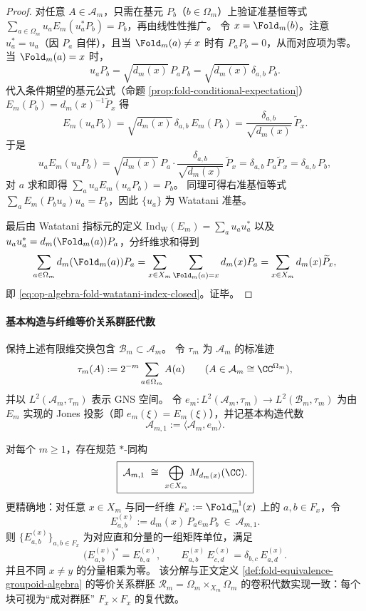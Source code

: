 \begin{proof}
对任意 \(A\in\mathcal{A}_m\)，只需在基元 \(P_b\)（\(b\in\Omega_m\)）上验证准基恒等式
\(
\sum_{a\in\Omega_m}u_a E_m(u_a^\ast P_b)=P_b
\)，再由线性性推广。
令 \(x=\Fold_m(b)\)。注意 \(u_a^\ast=u_a\)（因 \(P_a\) 自伴），且当 \(\Fold_m(a)\neq x\) 时有 \(P_aP_b=0\)，从而对应项为零。
当 \(\Fold_m(a)=x\) 时，
\[
u_aP_b=\sqrt{d_m(x)}\,P_aP_b=\sqrt{d_m(x)}\,\delta_{a,b}\,P_b.
\]
代入条件期望的基元公式（命题 \ref{prop:fold-conditional-expectation}）
\(
E_m(P_b)=d_m(x)^{-1}\widetilde P_x
\)
得
\[
E_m(u_aP_b)
=\sqrt{d_m(x)}\,\delta_{a,b}\,E_m(P_b)
=\frac{\delta_{a,b}}{\sqrt{d_m(x)}}\,\widetilde P_x.
\]
于是
\[
u_aE_m(u_aP_b)
=\sqrt{d_m(x)}\,P_a\cdot \frac{\delta_{a,b}}{\sqrt{d_m(x)}}\,\widetilde P_x
=\delta_{a,b}\,P_a\widetilde P_x
=\delta_{a,b}\,P_b,
\]
对 \(a\) 求和即得 \(\sum_a u_aE_m(u_aP_b)=P_b\)。
同理可得右准基恒等式 \(\sum_a E_m(P_bu_a)u_a=P_b\)，因此 \(\{u_a\}\) 为 Watatani 准基。

最后由 Watatani 指标元的定义
\(
\mathrm{Ind}_{\mathrm{W}}(E_m)=\sum_a u_a u_a^\ast
\)
以及 \(u_a u_a^\ast=d_m(\Fold_m(a))P_a\)，分纤维求和得到
\[
\sum_{a\in\Omega_m} d_m(\Fold_m(a))P_a
=\sum_{x\in X_m}\sum_{\Fold_m(a)=x} d_m(x)P_a
=\sum_{x\in X_m} d_m(x)\widetilde P_x,
\]
即 \eqref{eq:op-algebra-fold-watatani-index-closed}。证毕。
\end{proof}

\paragraph{基本构造与纤维等价关系群胚代数}
保持上述有限维交换包含 \(\mathcal B_m\subset \mathcal A_m\)。
令 \(\tau_m\) 为 \(\mathcal A_m\) 的标准迹
\[
\tau_m(A):=2^{-m}\sum_{a\in\Omega_m}A(a)\qquad(A\in\mathcal A_m\cong \CC^{\Omega_m}),
\]
并以 \(L^2(\mathcal A_m,\tau_m)\) 表示 GNS 空间。
令 \(e_m:L^2(\mathcal A_m,\tau_m)\to L^2(\mathcal B_m,\tau_m)\) 为由 \(E_m\) 实现的 Jones 投影（即 \(e_m(\xi)=E_m(\xi)\)），并记基本构造代数
\[
\mathcal A_{m,1}:=\langle \mathcal A_m,e_m\rangle.
\]

\begin{theorem}\label{thm:op-algebra-fold-basic-construction-pair-groupoid}
对每个 \(m\ge 1\)，存在规范 \(\ast\)-同构
\[
\boxed{\;\mathcal A_{m,1}\ \cong\ \bigoplus_{x\in X_m} M_{d_m(x)}(\CC).\;}
\]
更精确地：对任意 \(x\in X_m\) 与同一纤维 \(F_x:=\Fold_m^{-1}(x)\) 上的 \(a,b\in F_x\)，令
\[
E^{(x)}_{a,b}:=d_m(x)\,P_a e_m P_b\ \in\ \mathcal A_{m,1}.
\]
则 \(\{E^{(x)}_{a,b}\}_{a,b\in F_x}\) 为对应直和分量的一组矩阵单位，满足
\[
\bigl(E^{(x)}_{a,b}\bigr)^\ast=E^{(x)}_{b,a},
\qquad
E^{(x)}_{a,b}\,E^{(x)}_{c,d}=\delta_{b,c}\,E^{(x)}_{a,d}.
\]
并且不同 \(x\neq y\) 的分量相乘为零。
该分解与正文定义 \ref{def:fold-equivalence-groupoid-algebra} 的等价关系群胚 \(\mathcal R_m=\Omega_m\times_{X_m}\Omega_m\) 的卷积代数实现一致：每个块可视为“成对群胚” \(F_x\times F_x\) 的复代数。
\end{theorem}

